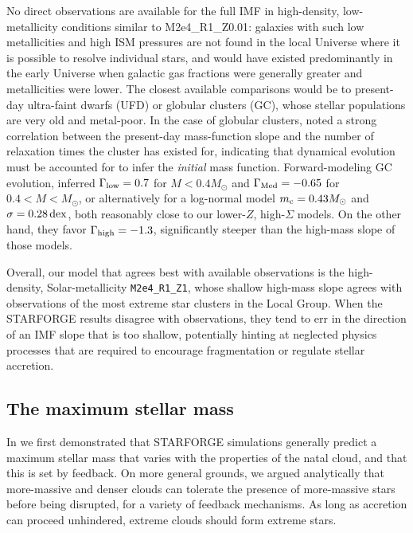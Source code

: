 \documentclass[apjl,twocolumn]{openjournal}
\begin{document}
No direct observations are available for the full IMF in high-density, low-metallicity conditions similar to \small{M2e4\_R1\_Z0.01}: galaxies with such low metallicities and high ISM pressures are not found in the local Universe where it is possible to resolve individual stars, and would have existed predominantly in the early Universe when galactic gas fractions were generally greater and metallicities were lower. The closest available comparisons would be to present-day ultra-faint dwarfs (UFD) or globular clusters (GC), whose stellar populations are very old and metal-poor. In the case of globular clusters, \citet{sollima:2017.gc.massfunc} noted a strong correlation between the present-day mass-function slope and the number of relaxation times the cluster has existed for, indicating that dynamical evolution must be accounted for to infer the {\it initial} mass function. Forward-modeling GC evolution, \citet{baumgardt:2023.gc.imf} inferred $\Gamma_{\rm low}=0.7$ for $M<0.4M_\odot$ and $\Gamma_{\rm Med}=-0.65$ for $0.4<M<M_\odot$, or alternatively for a log-normal model $m_{\rm c}=0.43M_\odot$ and $\sigma =0.28 \,\rm dex$, both reasonably close to our lower-$Z$, high-$\Sigma$ models. On the other hand, they favor $\Gamma_{\rm high}=-1.3$, significantly steeper than the high-mass slope of those models.


Overall, our model that agrees best with available observations is the high-density, Solar-metallicity \texttt{M2e4\_R1\_Z1}, whose shallow high-mass slope agrees with observations of the most extreme star clusters in the Local Group. When the \small{STARFORGE} results disagree with observations, they tend to err in the direction of an IMF slope that is too shallow, potentially hinting at neglected physics processes that are required to encourage fragmentation or regulate stellar accretion.

\subsection{The maximum stellar mass}
In \citet{grudic:2023.does.god.play.dice} we first demonstrated that \small{STARFORGE} simulations generally predict a maximum stellar mass that varies with the properties of the natal cloud, and that this is set by feedback. On more general grounds, we argued analytically that more-massive and denser clouds can tolerate the presence of more-massive stars before being disrupted, for a variety of feedback mechanisms. As long as accretion can proceed unhindered, extreme clouds should form extreme stars.
\end{document}
